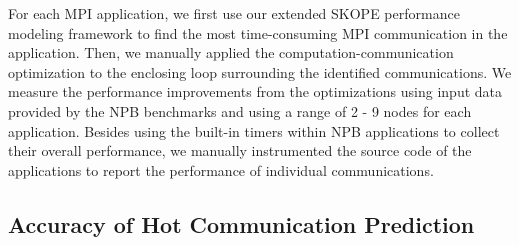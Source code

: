 For each MPI application, we first use our extended SKOPE performance modeling framework to find the most time-consuming MPI communication in the application.
Then, we manually applied the computation-communication optimization to the enclosing loop surrounding the identified communications.
We measure the performance improvements from the optimizations using input data
 provided by the NPB benchmarks and using a range of 2 - 9 nodes for each application.
Besides using the built-in timers within NPB applications to collect their overall performance,
  we manually instrumented the source code of the applications to report the performance of  individual communications.



\subsection{Accuracy of Hot Communication Prediction}

